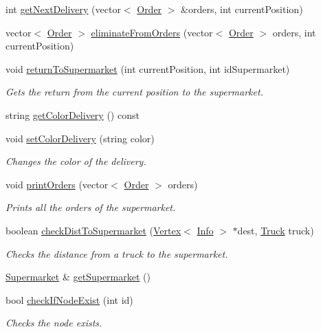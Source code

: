 \begin{DoxyCompactItemize}
int \hyperlink{class_company_a59aed26c4a06ccdaeb86daf6029e8455}{get\+Next\+Delivery} (vector$<$ \hyperlink{class_order}{Order} $>$ \&orders, int current\+Position)
\item 
vector$<$ \hyperlink{class_order}{Order} $>$ \hyperlink{class_company_a8a7826dfc219bd2dbd470fb3c125e465}{eliminate\+From\+Orders} (vector$<$ \hyperlink{class_order}{Order} $>$ orders, int current\+Position)
\item 
void \hyperlink{class_company_a113b614767a4ca7762c5f24cb5ec65cd}{return\+To\+Supermarket} (int current\+Position, int id\+Supermarket)
\begin{DoxyCompactList}\small\item\em Gets the return from the current position to the supermarket. \end{DoxyCompactList}\item 
string \hyperlink{class_company_a101cd0004c4ae653257ec2ece1adc2d4}{get\+Color\+Delivery} () const
\item 
void \hyperlink{class_company_a402565d3fea370859d04d2b06d083bb0}{set\+Color\+Delivery} (string color)
\begin{DoxyCompactList}\small\item\em Changes the color of the delivery. \end{DoxyCompactList}\item 
void \hyperlink{class_company_a07dc835ddc41d4156a50e270a7a7521c}{print\+Orders} (vector$<$ \hyperlink{class_order}{Order} $>$ orders)
\begin{DoxyCompactList}\small\item\em Prints all the orders of the supermarket. \end{DoxyCompactList}\item 
boolean \hyperlink{class_company_a0e42957c25959699229475aa7f634def}{check\+Dist\+To\+Supermarket} (\hyperlink{class_vertex}{Vertex}$<$ \hyperlink{class_info}{Info} $>$ $\ast$dest, \hyperlink{class_truck}{Truck} truck)
\begin{DoxyCompactList}\small\item\em Checks the distance from a truck to the supermarket. \end{DoxyCompactList}\item 
\hyperlink{class_supermarket}{Supermarket} \& \hyperlink{class_company_ad875d99d9e04d1e5ea87510970444a21}{get\+Supermarket} ()
\item 
bool \hyperlink{class_company_a06095b0acb0b928cc5795c2e69aa3448}{check\+If\+Node\+Exist} (int id)
\begin{DoxyCompactList}\small\item\em Checks the node exists. \end{DoxyCompactList}\item 

\end{DoxyCompactItemize}
